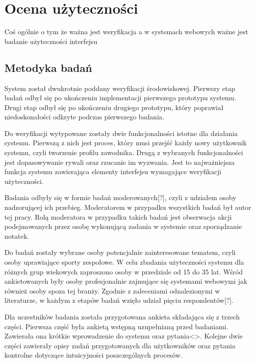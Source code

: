 \chapter{Ocena użyteczności}

Coś ogólnie o tym że ważna jest weryfikacja a w systemach webowych ważne jest badanie użyteczności interfejsu

\section{Metodyka badań}

System został dwukrotnie poddany weryfikacji środowiskowej. Pierwszy etap badań odbył się po ukończeniu implementacji pierwszego prototypu systemu. Drugi etap odbył się po ukończeniu drugiego prototypu, który poprawiał niedoskonałości odkryte podczas pierwszego badania.

Do weryfikacji wytypowane zostały dwie funkcjonalności istotne dla działania systemu. Pierwszą z nich jest proces, który musi przejść każdy nowy użytkownik systemu, czyli tworzenie profilu zawodnika. Drugą z wybranych funkcjonalności jest dopasowywanie rywali oraz rzucanie im wyzwania. Jest to najważniejsza funkcja systemu zawierająca elementy interfejsu wymagające weryfikacji użyteczności.

Badania odbyły się w formie badań moderowanych[?], czyli z udziałem osoby nadzorującej ich przebieg. Moderatorem w przypadku wszystkich badań był autor tej pracy. Rolą moderatora w przypadku takich badań jest obserwacja akcji podejmowanych przez osobę wykonującą zadania w systemie oraz sporządzanie notatek.

Do badań zostały wybrane osoby potencjalnie zainteresowane tematem, czyli osoby uprawiające sporty zespołowe. W celu zbadania użyteczności systemu dla różnych grup wiekowych zaproszono osoby w przedziale od 15 do 35 lat. Wśród ankietowanych były osoby profesjonalnie zajmujące się systemami webowymi jak również osoby spoza tej branży. Zgodnie z zaleceniami odnalezionymi w literaturze, w każdym z etapów badań wzięło udział pięciu respondentów[?].

Dla uczestników badania została przygotowana ankieta składająca się z trzech części. Pierwsza część była ankietą wstępną uzupełnianą przed badaniami. Zawierała ona krótkie wprowadzenie do systemu oraz pytania<>. Kolejne dwie części zawierały opisy zadań przygotowanych dla użytkowników oraz pytania kontrolne dotyczące intuicyjności poszczególnych procesów. 

